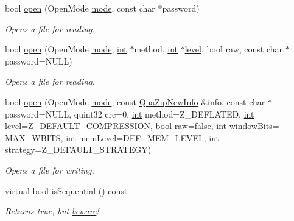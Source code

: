 \begin{DoxyCompactItemize}
bool \hyperlink{class_qua_zip_file_a0bff0d15bbcd70306dc4a553a55776b9}{open} (Open\-Mode \hyperlink{glext_8h_a1e71d9c196e4683cc06c4b54d53f7ef5}{mode}, const char $\ast$password)
\begin{DoxyCompactList}\small\item\em Opens a file for reading. \end{DoxyCompactList}\item 
bool \hyperlink{class_qua_zip_file_aed75bace51f2bb4c3e4f656ab4493aac}{open} (Open\-Mode \hyperlink{glext_8h_a1e71d9c196e4683cc06c4b54d53f7ef5}{mode}, \hyperlink{ioapi_8h_a787fa3cf048117ba7123753c1e74fcd6}{int} $\ast$method, \hyperlink{ioapi_8h_a787fa3cf048117ba7123753c1e74fcd6}{int} $\ast$\hyperlink{glext_8h_abc60a79088789bd61297bf5f9ff500d1}{level}, bool raw, const char $\ast$password=N\-U\-L\-L)
\begin{DoxyCompactList}\small\item\em Opens a file for reading. \end{DoxyCompactList}\item 
bool \hyperlink{class_qua_zip_file_a2429ea59c77371d7af56d739db130b18}{open} (Open\-Mode \hyperlink{glext_8h_a1e71d9c196e4683cc06c4b54d53f7ef5}{mode}, const \hyperlink{struct_qua_zip_new_info}{Qua\-Zip\-New\-Info} \&info, const char $\ast$password=N\-U\-L\-L, quint32 crc=0, \hyperlink{ioapi_8h_a787fa3cf048117ba7123753c1e74fcd6}{int} method=Z\-\_\-\-D\-E\-F\-L\-A\-T\-E\-D, \hyperlink{ioapi_8h_a787fa3cf048117ba7123753c1e74fcd6}{int} \hyperlink{glext_8h_abc60a79088789bd61297bf5f9ff500d1}{level}=Z\-\_\-\-D\-E\-F\-A\-U\-L\-T\-\_\-\-C\-O\-M\-P\-R\-E\-S\-S\-I\-O\-N, bool raw=false, \hyperlink{ioapi_8h_a787fa3cf048117ba7123753c1e74fcd6}{int} window\-Bits=-\/M\-A\-X\-\_\-\-W\-B\-I\-T\-S, \hyperlink{ioapi_8h_a787fa3cf048117ba7123753c1e74fcd6}{int} mem\-Level=D\-E\-F\-\_\-\-M\-E\-M\-\_\-\-L\-E\-V\-E\-L, \hyperlink{ioapi_8h_a787fa3cf048117ba7123753c1e74fcd6}{int} strategy=Z\-\_\-\-D\-E\-F\-A\-U\-L\-T\-\_\-\-S\-T\-R\-A\-T\-E\-G\-Y)
\begin{DoxyCompactList}\small\item\em Opens a file for writing. \end{DoxyCompactList}\item 
virtual bool \hyperlink{class_qua_zip_file_a64430ec50820c8096f963a7e5f53001f}{is\-Sequential} () const 
\begin{DoxyCompactList}\small\item\em Returns {\ttfamily true}, but \hyperlink{class_qua_zip_file_quazipfile-sequential}{beware}! \end{DoxyCompactList}\item 

\end{DoxyCompactItemize}
